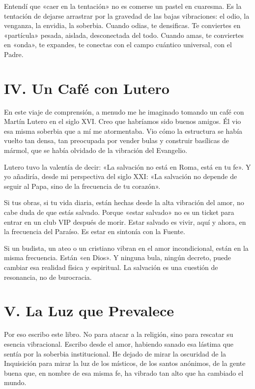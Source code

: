 \documentclass[11pt,a5paper]{book}
\begin{document}
Entendí que «caer en la tentación» no es comerse un pastel en cuaresma. Es la tentación de dejarse arrastrar por la gravedad de las bajas vibraciones: el odio, la venganza, la envidia, la soberbia. Cuando odias, te densificas. Te conviertes en «partícula» pesada, aislada, desconectada del todo. Cuando amas, te conviertes en «onda», te expandes, te conectas con el campo cuántico universal, con el Padre.

\section*{IV. Un Café con Lutero}

En este viaje de comprensión, a menudo me he imaginado tomando un café con Martín Lutero en el siglo XVI. Creo que habríamos sido buenos amigos. Él vio esa misma soberbia que a mí me atormentaba. Vio cómo la estructura se había vuelto tan densa, tan preocupada por vender bulas y construir basílicas de mármol, que se había olvidado de la vibración del Evangelio.

Lutero tuvo la valentía de decir: «La salvación no está en Roma, está en tu fe». Y yo añadiría, desde mi perspectiva del siglo XXI: «La salvación no depende de seguir al Papa, sino de la frecuencia de tu corazón».

Si tus obras, si tu vida diaria, están hechas desde la alta vibración del amor, no cabe duda de que estás salvado. Porque «estar salvado» no es un ticket para entrar en un club VIP después de morir. Estar salvado es vivir, aquí y ahora, en la frecuencia del Paraíso. Es estar en sintonía con la Fuente.

Si un budista, un ateo o un cristiano vibran en el amor incondicional, están en la misma frecuencia. Están «en Dios». Y ninguna bula, ningún decreto, puede cambiar esa realidad física y espiritual. La salvación es una cuestión de resonancia, no de burocracia.

\section*{V. La Luz que Prevalece}

Por eso escribo este libro. No para atacar a la religión, sino para rescatar su esencia vibracional. Escribo desde el amor, habiendo sanado esa lástima que sentía por la soberbia institucional. He dejado de mirar la oscuridad de la Inquisición para mirar la luz de los místicos, de los santos anónimos, de la gente buena que, en nombre de esa misma fe, ha vibrado tan alto que ha cambiado el mundo.
\end{document}
